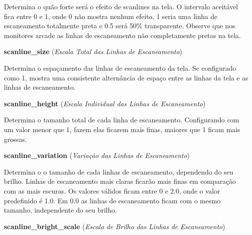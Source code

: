 \documentclass[letterpaper,10pt,brazil]{sphinxmanual}
\begin{document}
\begin{DUlineblock}{0em}
\begin{DUlineblock}{\DUlineblockindent}
\item[] Determina o quão forte será o efeito de scanlines na tela. O intervalo aceitável fica entre 0 e 1, onde 0 não mostra nenhum efeito, 1 seria uma linha de escaneamento totalmente preta e 0.5 será 50\% transparente. Observe que nos monitores arcade as linhas de escaneamento não completamente pretas na tela.
\item[] 
\end{DUlineblock}
\item[] \textbf{scanline\_size} (\emph{Escala Total das Linhas de Escaneamento})
\item[] 
\item[]
\begin{DUlineblock}{\DUlineblockindent}
\item[] Determina o espaçamento das linhas de escaneamento da tela. Se configurado como 1, mostra uma consistente alternância de espaço entre as linhas da tela e as linhas de escaneamento.
\item[] 
\end{DUlineblock}
\item[] \textbf{scanline\_height} (\emph{Escala Individual das Linhas de Escaneamento})
\item[] 
\item[]
\begin{DUlineblock}{\DUlineblockindent}
\item[] Determina o tamanho total de cada linha de escaneamento. Configurando com um valor menor que 1, fazem elas ficarem mais finas, maiores que 1 ficam mais grossas.
\item[] 
\end{DUlineblock}
\item[] \textbf{scanline\_variation} (\emph{Variação das Linhas de Escaneamento})
\item[] 
\item[]
\begin{DUlineblock}{\DUlineblockindent}
\item[] Determina o o tamanho de cada linhas de escaneamento, dependendo do seu brilho. Linhas de escaneamento mais claras ficarão mais finas em comparação com as mais escuras. Os valores válidos ficam entre 0 e 2.0, onde o valor predefinido é 1.0. Em 0.0 as linhas de escaneamento ficam com o mesmo tamanho, independente do seu brilho.
\item[] 
\end{DUlineblock}
\item[] \textbf{scanline\_bright\_scale} (\emph{Escala de Brilho das Linhas de Escaneamento})

\end{DUlineblock}
\end{document}
